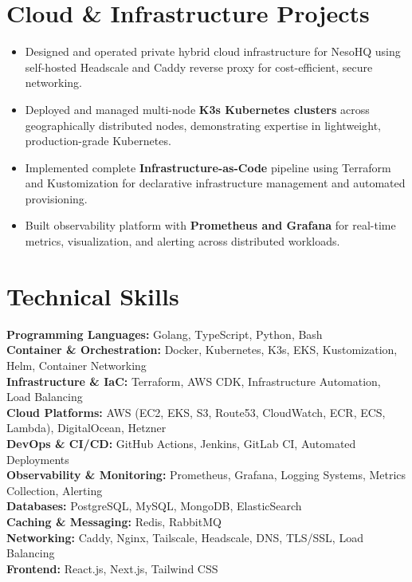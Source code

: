 \documentclass[11pt,a4paper]{article}
\begin{document}
\section*{Cloud \& Infrastructure Projects}
\begin{itemize}[leftmargin=*,noitemsep]
    \item Designed and operated private hybrid cloud infrastructure for NesoHQ using self-hosted Headscale and Caddy reverse proxy for cost-efficient, secure networking.
    \item Deployed and managed multi-node \textbf{K3s Kubernetes clusters} across geographically distributed nodes, demonstrating expertise in lightweight, production-grade Kubernetes.
    \item Implemented complete \textbf{Infrastructure-as-Code} pipeline using Terraform and Kustomization for declarative infrastructure management and automated provisioning.
    \item Built observability platform with \textbf{Prometheus and Grafana} for real-time metrics, visualization, and alerting across distributed workloads.
\end{itemize}

\section*{Technical Skills}
\textbf{Programming Languages:} Golang, TypeScript, Python, Bash \\
\textbf{Container \& Orchestration:} Docker, Kubernetes, K3s, EKS, Kustomization, Helm, Container Networking \\
\textbf{Infrastructure \& IaC:} Terraform, AWS CDK, Infrastructure Automation, Load Balancing \\
\textbf{Cloud Platforms:} AWS (EC2, EKS, S3, Route53, CloudWatch, ECR, ECS, Lambda), DigitalOcean, Hetzner \\
\textbf{DevOps \& CI/CD:} GitHub Actions, Jenkins, GitLab CI, Automated Deployments \\
\textbf{Observability \& Monitoring:} Prometheus, Grafana, Logging Systems, Metrics Collection, Alerting \\
\textbf{Databases:} PostgreSQL, MySQL, MongoDB, ElasticSearch \\
\textbf{Caching \& Messaging:} Redis, RabbitMQ \\
\textbf{Networking:} Caddy, Nginx, Tailscale, Headscale, DNS, TLS/SSL, Load Balancing \\
\textbf{Frontend:} React.js, Next.js, Tailwind CSS
\end{document}
